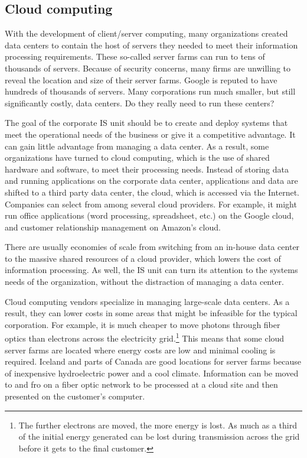 \documentclass[
]{article}
\begin{document}
\hypertarget{cloud-computing}{%
\subsection*{Cloud computing}\label{cloud-computing}}

With the development of client/server computing, many organizations
created data centers to contain the host of servers they needed to meet
their information processing requirements. These so-called server farms
can run to tens of thousands of servers. Because of security concerns,
many firms are unwilling to reveal the location and size of their server
farms. Google is reputed to have hundreds of thousands of servers. Many
corporations run much smaller, but still significantly costly, data
centers. Do they really need to run these centers?

The goal of the corporate IS unit should be to create and deploy systems
that meet the operational needs of the business or give it a competitive
advantage. It can gain little advantage from managing a data center. As
a result, some organizations have turned to cloud computing, which is
the use of shared hardware and software, to meet their processing needs.
Instead of storing data and running applications on the corporate data
center, applications and data are shifted to a third party data center,
the cloud, which is accessed via the Internet. Companies can select from
among several cloud providers. For example, it might run office
applications (word processing, spreadsheet, etc.) on the Google cloud,
and customer relationship management on Amazon's cloud.

There are usually economies of scale from switching from an in-house
data center to the massive shared resources of a cloud provider, which
lowers the cost of information processing. As well, the IS unit can turn
its attention to the systems needs of the organization, without the
distraction of managing a data center.

Cloud computing vendors specialize in managing large-scale data centers.
As a result, they can lower costs in some areas that might be infeasible
for the typical corporation. For example, it is much cheaper to move
photons through fiber optics than electrons across the electricity
grid.\footnote{The further electrons are moved, the more energy is
  lost. As much as a third of the initial energy generated can be lost
  during transmission across the grid before it gets to the final
  customer.} This means that some cloud server farms are
located where energy costs are low and minimal cooling is required.
Iceland and parts of Canada are good locations for server farms because
of inexpensive hydroelectric power and a cool climate. Information can
be moved to and fro on a fiber optic network to be processed at a cloud
site and then presented on the customer's computer.
\end{document}
